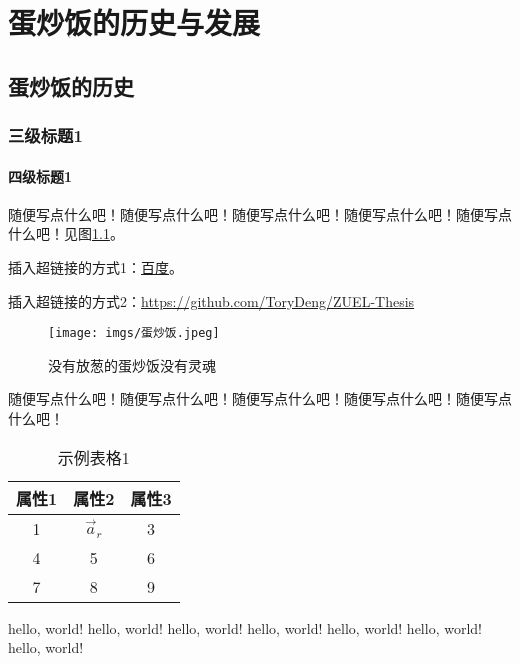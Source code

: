 \chapter{蛋炒饭的历史与发展}
\section{蛋炒饭的历史}
\subsection{三级标题1}
\subsubsection{四级标题1}
随便写点什么吧！随便写点什么吧！随便写点什么吧！随便写点什么吧！随便写点什么吧！见图\ref{fig:my_label}。

插入超链接的方式1：\href{http://www.baidu.com}{百度}。 \par
插入超链接的方式2：\url{https://github.com/ToryDeng/ZUEL-Thesis}

\begin{figure}[h]
    \centering
    \texttt{[image: imgs/蛋炒饭.jpeg]}
    \caption{没有放葱的蛋炒饭没有灵魂}
    \label{fig:my_label}
\end{figure}

随便写点什么吧！随便写点什么吧！随便写点什么吧！随便写点什么吧！随便写点什么吧！
\begin{table}[h]

\caption{示例表格1}
\begin{center}
    \begin{tabular}{ccc}
    \toprule
    \textbf{属性1} & \textbf{属性2} & \textbf{属性3} \\ \midrule
    1            & $\Vec{a}_r$  & 3            \\
    4            & 5            & 6            \\
    7            & 8            & 9            \\ \bottomrule
    \end{tabular}
\end{center}\label{tab:exp_table1}

\end{table}
hello, world! hello, world! hello, world! hello, world! hello, world! hello, world! hello, world!